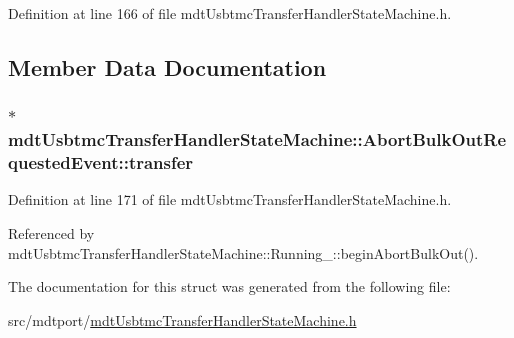 Definition at line 166 of file mdt\-Usbtmc\-Transfer\-Handler\-State\-Machine.\-h.



\subsection{Member Data Documentation}
\hypertarget{structmdt_usbtmc_transfer_handler_state_machine_1_1_abort_bulk_out_requested_event_a73d3de7c7e2e7847cfcc64aeaf132a70}{
\subsubsection[{transfer}]{$\ast$ mdt\-Usbtmc\-Transfer\-Handler\-State\-Machine\-::\-Abort\-Bulk\-Out\-Requested\-Event\-::transfer}}\label{structmdt_usbtmc_transfer_handler_state_machine_1_1_abort_bulk_out_requested_event_a73d3de7c7e2e7847cfcc64aeaf132a70}


Definition at line 171 of file mdt\-Usbtmc\-Transfer\-Handler\-State\-Machine.\-h.



Referenced by mdt\-Usbtmc\-Transfer\-Handler\-State\-Machine\-::\-Running\-\_\-\-::begin\-Abort\-Bulk\-Out().



The documentation for this struct was generated from the following file\-:\begin{DoxyCompactItemize}
\item 
src/mdtport/\hyperlink{mdt_usbtmc_transfer_handler_state_machine_8h}{mdt\-Usbtmc\-Transfer\-Handler\-State\-Machine.\-h}\end{DoxyCompactItemize}
